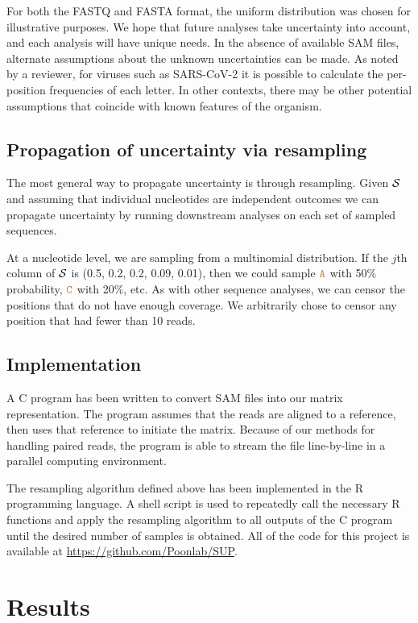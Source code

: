 \documentclass[12pt]{article}
\begin{document}
For both the FASTQ and FASTA format, the uniform distribution was chosen for illustrative purposes.
We hope that future analyses take uncertainty into account, and each analysis will have unique needs.
In the absence of available SAM files, alternate assumptions about the unknown uncertainties can be made.
As noted by a reviewer, for viruses such as SARS-CoV-2 it is possible to calculate the per-position frequencies of each letter.
In other contexts, there may be other potential assumptions that coincide with known features of the organism.


\subsection{Propagation of uncertainty via resampling}

The most general way to propagate uncertainty is through resampling.
Given $\mathcal{S}$ and assuming that individual nucleotides are independent outcomes we can propagate uncertainty by running downstream analyses on each set of sampled sequences.

At a nucleotide level, we are sampling from a multinomial distribution.
If the $j$th column of $\mathcal{S}$ is (0.5, 0.2, 0.2, 0.09, 0.01), then we could sample $\texttt{\textcolor{brown}{A}}$ with 50\% probability, $\texttt{\textcolor{brown}{C}}$ with 20\%, etc.
As with other sequence analyses, we can censor the positions that do not have enough coverage.
We arbitrarily chose to censor any position that had fewer than 10 reads.

\subsection{Implementation}

A C program has been written to convert SAM files into our matrix representation.
The program assumes that the reads are aligned to a reference, then uses that reference to initiate the matrix.
Because of our methods for handling paired reads, the program is able to stream the file line-by-line in a parallel computing environment.

The resampling algorithm defined above has been implemented in the R programming language.
A shell script is used to repeatedly call the necessary R functions and apply the resampling algorithm to all outputs of the C program until the desired number of samples is obtained.
All of the code for this project is available at \url{https://github.com/Poonlab/SUP}.

\section{Results}
\end{document}
